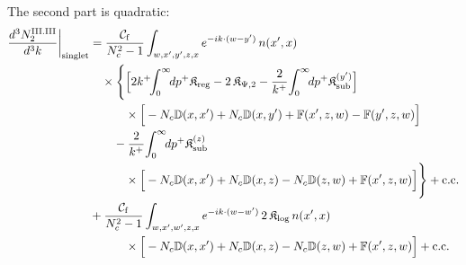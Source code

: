 The second part is quadratic:
\begin{align}\label{eq:sIIIIII2}
\frac{d^3N^{\rm III.III}_2}{d^3k}\bigg|_{\rm singlet}&=\frac{\mathcal C_{\rm f}}{N_c^2-1}\int_{w,x',y',z,x}e^{-ik\cdot(w-y')}\,n(x',x)\notag\\
&\quad\times\Bigg\{\Big[2k^+\!\!\int_0^\infty\!\!dp^+\mathfrak K_{\rm reg}-2\,\mathfrak K_{\Psi,2}-\frac{2}{k^+}\!\int_0^\infty\!\!dp^+\mathfrak K^{(y')}_{\rm sub}\Big]\notag\\
&\qquad\quad\times\Big[-N_c\mf D(x,x')+N_c\mf D(x,y')+\mf F(x',z,w)-\mf F(y',z,w)\Big]\notag\\
&\qquad-\frac{2}{k^+}\!\int_0^\infty\!\!dp^+\mathfrak K^{(z)}_{\rm sub}\notag\\&\qquad\quad\times\Big[-N_c\mf D(x,x')+N_c\mf D(x,z)-N_c\mf D(z,w)+\mf F(x',z,w)\Big]\Bigg\}+{\rm c.c.}\notag\\
&+\frac{\mathcal C_{\rm f}}{N_c^2-1}\int_{w,x',w',z,x}e^{-ik\cdot(w-w')}\,2\,\mathfrak K_{\log}\,n(x',x)\notag\\
&\qquad\quad\times\Big[-N_c\mf D(x,x')+N_c\mf D(x,z)-N_c\mf D(z,w)+\mf F(x',z,w)\Big]+{\rm c.c.}
\end{align}

